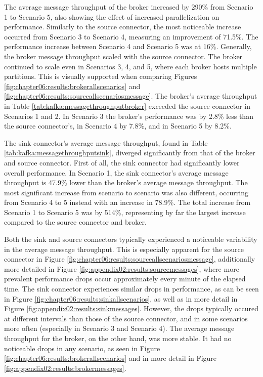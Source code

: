 The average message throughput of the broker increased by 290\% from Scenario 1 to Scenario 5, also showing the effect of increased parallelization on performance. Similarly to the source connector, the most noticeable increase occurred from Scenario 3 to Scenario 4, measuring an improvement of 71.5\%. The performance increase between Scenario 4 and Scenario 5 was at 16\%. Generally, the broker message throughput scaled with the source connector. The broker continued to scale even in Scenarios 3, 4, and 5, where each broker hosts multiple partitions. This is visually supported when comparing Figures \ref{fig:chapter06:results:brokerallscenarios} and \ref{fig:chapter06:results:sourceallscenariosmessage}. The broker's average throughput in Table \ref{tab:kafka:messagethroughputbroker} exceeded the source connector in Scenarios 1 and 2. In Scenario 3 the broker's performance was by 2.8\% less than the source connector's, in Scenario 4 by 7.8\%, and in Scenario 5 by 8.2\%.

The sink connector's average message throughput, found in Table \ref{tab:kafka:messagethroughputsink}, diverged significantly from that of the broker and source connector. First of all, the sink connector had significantly lower overall performance. In Scenario 1, the sink connector's average message throughput is 47.9\% lower than the broker's average message throughput. The most significant increase from scenario to scenario was also different, occurring from Scenario 4 to 5 instead with an increase in 78.9\%. The total increase from Scenario 1 to Scenario 5 was by 514\%, representing by far the largest increase compared to the source connector and broker. 

Both the sink and source connectors typically experienced a noticeable variability in the average message throughput. This is especially apparent for the source connector in Figure \ref{fig:chapter06:results:sourceallscenariosmessage}, additionally more detailed in Figure \ref{fig:appendix02:results:sourcemessages}, where more prevalent performance drops occur approximately every minute of the elapsed time. The sink connector experiences similar drops in performance, as can be seen in Figure \ref{fig:chapter06:results:sinkallscenarios}, as well as in more detail in Figure \ref{fig:appendix02:results:sinkmessages}. However, the drops typically occured at different intervals than those of the source connector, and in some scenarios more often (especially in Scenario 3 and Scenario 4). The average message throughput for the broker, on the other hand, was more stable. It had no noticeable drops in any scenario, as seen in Figure \ref{fig:chapter06:results:brokerallscenarios} and in more detail in Figure \ref{fig:appendix02:results:brokermessages}.

